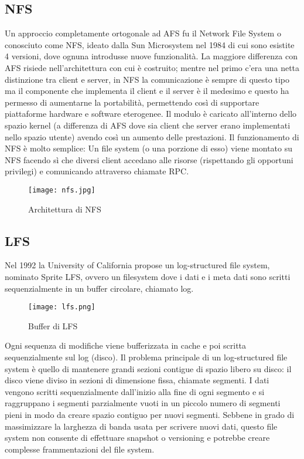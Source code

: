 \subsection{NFS}
Un approccio completamente ortogonale ad AFS fu il Network File System o conosciuto come NFS, ideato dalla Sun Microsystem nel 1984 di cui sono esistite 4 versioni, dove ognuna introdusse nuove funzionalità. La maggiore differenza con AFS risiede nell'architettura con cui è costruito; mentre nel primo c'era una netta distinzione tra client e server, in NFS la comunicazione è sempre di questo tipo ma il componente che implementa il client e il server è il medesimo e questo ha permesso di aumentarne la portabilità, permettendo così di supportare piattaforme hardware e software eterogenee. Il modulo è caricato all'interno dello spazio kernel (a differenza di AFS dove sia client che server erano implementati nello spazio utente) avendo così un aumento delle prestazioni. Il funzionamento di NFS è molto semplice: Un file system (o una porzione di esso) viene montato su NFS facendo sì che diversi client accedano alle risorse (rispettando gli opportuni privilegi) e comunicando attraverso chiamate RPC.
\begin{figure}[H]
  \begin{center}
    \texttt{[image: nfs.jpg]}
    \caption{Architettura di NFS}
    \label{fg:nfs.jpg}
  \end{center}
\end{figure}
\subsection{LFS}
Nel 1992 la University of California propose un log-structured file system, nominato Sprite LFS, ovvero un filesystem dove i dati e i meta dati sono scritti sequenzialmente in un buffer circolare, chiamato log.\cite{rosenblum92}
\begin{figure}[H]
  \begin{center}
    \texttt{[image: lfs.png]}
    \caption{Buffer di LFS}
    \label{fg:lfs.jpg}
  \end{center}
\end{figure}
Ogni sequenza di modifiche viene bufferizzata in cache e poi scritta sequenzialmente sul log (disco). Il problema principale di un log-structured file system è quello di mantenere grandi sezioni contigue di spazio libero su disco: il disco viene diviso in sezioni di dimensione fissa, chiamate segmenti. I dati vengono scritti sequenzialmente dall'inizio alla fine di ogni segmento e si raggruppano i segmenti parzialmente vuoti in un piccolo numero di segmenti pieni in modo da creare spazio contiguo per nuovi segmenti. Sebbene in grado di massimizzare la larghezza di banda usata per scrivere nuovi dati, questo file system non consente di effettuare snapshot o versioning e potrebbe creare complesse frammentazioni del file system.
